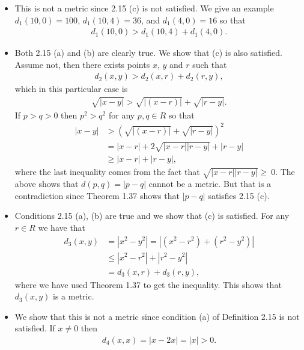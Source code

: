 \documentclass[11pt]{article}
\author{Hesam Pakdaman}
\date{\today}
\title{}
\newcommand{\dist}[3]{d_#1(#2, #3)}
\begin{document}
\begin{itemize}
\item[\noindent\textbf{11.} $\dist{1}{x}{y}$] This is not a metric
  since 2.15 (c) is not satisfied. We give an example
  $\dist{1}{10}{0} = 100$, $\dist{1}{10}{4} = 36$, and
  $\dist{1}{4}{0} = 16$ so that
  \begin{align*}
    \dist{1}{10}{0} > \dist{1}{10}{4} + \dist{1}{4}{0}.
  \end{align*}

\item[$\dist{2}{x}{y}$] Both 2.15 (a) and (b) are clearly true. We
  show that (c) is also satisfied. Assume not, then there exists
  points $x$, $y$ and $r$ such that
  \begin{align*}
    \dist{2}{x}{y} > \dist{2}{x}{r} + \dist{2}{r}{y},
  \end{align*}
  which in this particular case is
  \begin{align*}
    \sqrt{|x-y|} > \sqrt{|(x-r)|} + \sqrt{|r-y|}.
  \end{align*}
  If $p > q > 0$ then $p^2 > q^2$ for any $p,q \in R$ so that
    \begin{align*}
      |x-y| &> (\sqrt{|(x-r)|} + \sqrt{|r-y|})^2 \\
            &= |x-r| + 2\sqrt{|x-r| |r-y|} + |r-y| \\
            &\geq |x-r| + |r-y|,
  \end{align*}
  where the last inequality comes from the fact that
  $\sqrt{|x-r| |r-y|} \geq~0$. The above shows that $d(p,q) = |p - q|$
  cannot be a metric. But that is a contradiction since Theorem 1.37
  shows that $|p-q|$ satisfies 2.15 (c).

\item[$\dist{3}{x}{y}$] Conditions 2.15 (a), (b) are true and we show
  that (c) is satisfied. For any $r \in R$ we have that
  \begin{align*}
    \dist{3}{x}{y} &= |x^2 - y^2| = |(x^2-r^2) + (r^2-y^2)| \\
                   &\leq |x^2-r^2| + |r^2-y^2| \\
                   &= \dist{3}{x}{r} + \dist{3}{r}{y},
  \end{align*}
  where we have used Theorem 1.37 to get the inequality. This shows
  that $\dist{3}{x}{y}$ is a metric.

\item[$\dist{4}{x}{y}$] We show that this is not a metric since
  condition (a) of Definition 2.15 is not satisfied. If $x \neq 0$
  then
  \begin{align*}
    \dist{4}{x}{x} = |x - 2x| = |x| > 0.
  \end{align*}


\end{itemize}
\end{document}
